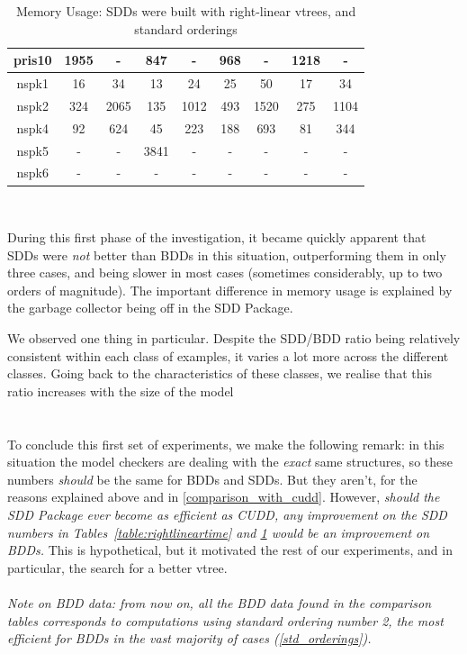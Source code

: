 \documentclass[11pt]{article}
\begin{document}
\begin{table}
\begin{tabular}{|*{9}{c|}}
pris10 & 1955 & - & 847 & - & 968 & - & 1218 & -\\ \hline
nspk1 & 16 & 34 & 13 & 24 & 25 & 50 & 17 & 34 \\ \hline
nspk2 & 324 & 2065 & 135 & 1012 & 493 & 1520 & 275 & 1104 \\ \hline
nspk4 & 92 & 624 & 45 & 223  & 188 & 693 & 81 & 344 \\ \hline
nspk5 & - & - & 3841 & - & - & - & - & -\\ \hline
nspk6 & -&- &- &-  &- &- &- &- \\ \hline
\end{tabular}
\\
\caption{Memory Usage: SDDs were built with right-linear vtrees, and standard orderings}
\label{table:rightlinearmemory}
\end{table}

During this first phase of the investigation, it became quickly apparent that SDDs were \textit{not }better than BDDs in this situation, outperforming them in only three cases, and being slower in most cases (sometimes considerably, up to two orders of magnitude). The important difference in memory usage is explained by the garbage collector being off in the SDD Package. 

We observed one thing in particular. Despite the SDD/BDD ratio being relatively consistent within each class of examples, it varies a lot more across the different classes. Going back to the characteristics of these classes, we realise that this ratio increases with the size of the model  
\\\\\\


To conclude this first set of experiments, we make the following remark: in this situation the model checkers are dealing with the \textit{exact} same structures, so these numbers \textit{should }be the same for BDDs and SDDs. But they aren't, for the reasons explained above and in \ref{comparison_with_cudd}. However, \textit{should the SDD Package ever become as efficient as CUDD, any improvement on the SDD numbers in Tables~\ref{table:rightlineartime} and \ref{table:rightlinearmemory} would be an improvement on BDDs.} This is hypothetical, but it motivated the rest of our experiments, and in particular, the search for a better vtree.
\\\\
\textit{Note on BDD data: from now on, all the BDD data found in the comparison tables corresponds to computations using standard ordering number 2, the most efficient for BDDs in the vast majority of cases (\ref{std_orderings}).
}
\end{document}
